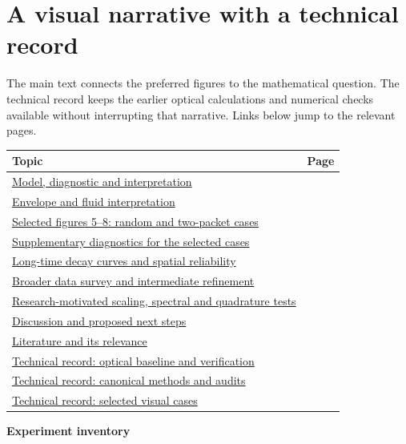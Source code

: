 \documentclass[10pt,letterpaper]{article}
\begin{document}
\section*{A visual narrative with a technical record}
The main text connects the preferred figures to the mathematical question. The
technical record keeps the earlier optical calculations and numerical checks
available without interrupting that narrative. Links below jump to the relevant pages.
\begin{center}\begin{tabular}{p{.77\linewidth}r}\toprule
Topic & Page\\\midrule
\hyperref[target]{Model, diagnostic and interpretation} & \pageref{target}\\
\hyperref[envelope]{Envelope and fluid interpretation} & \pageref{envelope}\\
\hyperref[randomvolume]{Selected figures 5--8: random and two-packet cases} & \pageref{randomvolume}\\
\hyperref[selecteddiag]{Supplementary diagnostics for the selected cases} & \pageref{selecteddiag}\\
\hyperref[longresults]{Long-time decay curves and spatial reliability} & \pageref{longresults}\\
\hyperref[survey]{Broader data survey and intermediate refinement} & \pageref{survey}\\
\hyperref[research]{Research-motivated scaling, spectral and quadrature tests} & \pageref{research}\\
\hyperref[discussion]{Discussion and proposed next steps} & \pageref{discussion}\\
\hyperref[literature]{Literature and its relevance} & \pageref{literature}\\
\hyperref[optical]{Technical record: optical baseline and verification} & \pageref{optical}\\
\hyperref[intermediate]{Technical record: canonical methods and audits} & \pageref{intermediate}\\
\hyperref[selectedmethods]{Technical record: selected visual cases} & \pageref{selectedmethods}\\\bottomrule
\end{tabular}\end{center}
\textbf{Experiment inventory}\par
\end{document}
